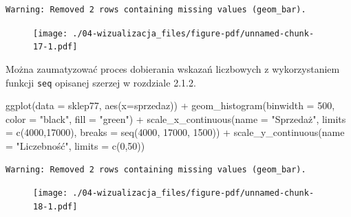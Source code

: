 \documentclass[
  letterpaper,
  DIV=11,
  numbers=noendperiod]{scrreprt}
\newenvironment{Shaded}{\begin{snugshade}}{\end{snugshade}}
\newcommand{\AttributeTok}[1]{\textcolor[rgb]{0.40,0.45,0.13}{#1}}
\newcommand{\DecValTok}[1]{\textcolor[rgb]{0.68,0.00,0.00}{#1}}
\newcommand{\FunctionTok}[1]{\textcolor[rgb]{0.28,0.35,0.67}{#1}}
\newcommand{\NormalTok}[1]{\textcolor[rgb]{0.00,0.23,0.31}{#1}}
\newcommand{\SpecialCharTok}[1]{\textcolor[rgb]{0.37,0.37,0.37}{#1}}
\newcommand{\StringTok}[1]{\textcolor[rgb]{0.13,0.47,0.30}{#1}}
\begin{document}
\begin{verbatim}
Warning: Removed 2 rows containing missing values (geom_bar).
\end{verbatim}

\begin{figure}[H]

{\centering \texttt{[image: ./04-wizualizacja\_files/figure-pdf/unnamed-chunk-17-1.pdf]}

}

\end{figure}

Można zaumatyzować proces dobierania wskazań liczbowych z wykorzystaniem
funkcji \texttt{seq} opisanej szerzej w rozdziale 2.1.2.

\begin{Shaded}
\begin{Highlighting}[]
\FunctionTok{ggplot}\NormalTok{(}\AttributeTok{data =}\NormalTok{ sklep77, }\FunctionTok{aes}\NormalTok{(}\AttributeTok{x=}\NormalTok{sprzedaz)) }\SpecialCharTok{+}
  \FunctionTok{geom\_histogram}\NormalTok{(}\AttributeTok{binwidth =} \DecValTok{500}\NormalTok{, }
                 \AttributeTok{color =} \StringTok{"black"}\NormalTok{, }\AttributeTok{fill =} \StringTok{"green"}\NormalTok{) }\SpecialCharTok{+}
  \FunctionTok{scale\_x\_continuous}\NormalTok{(}\AttributeTok{name =} \StringTok{"Sprzedaż"}\NormalTok{, }
                     \AttributeTok{limits =} \FunctionTok{c}\NormalTok{(}\DecValTok{4000}\NormalTok{,}\DecValTok{17000}\NormalTok{),}
                     \AttributeTok{breaks =} \FunctionTok{seq}\NormalTok{(}\DecValTok{4000}\NormalTok{, }\DecValTok{17000}\NormalTok{, }\DecValTok{1500}\NormalTok{)) }\SpecialCharTok{+}
  \FunctionTok{scale\_y\_continuous}\NormalTok{(}\AttributeTok{name =} \StringTok{"Liczebność"}\NormalTok{,}
                     \AttributeTok{limits =} \FunctionTok{c}\NormalTok{(}\DecValTok{0}\NormalTok{,}\DecValTok{50}\NormalTok{))}
\end{Highlighting}
\end{Shaded}

\begin{verbatim}
Warning: Removed 2 rows containing missing values (geom_bar).
\end{verbatim}

\begin{figure}[H]

{\centering \texttt{[image: ./04-wizualizacja\_files/figure-pdf/unnamed-chunk-18-1.pdf]}

}

\end{figure}
\end{document}
